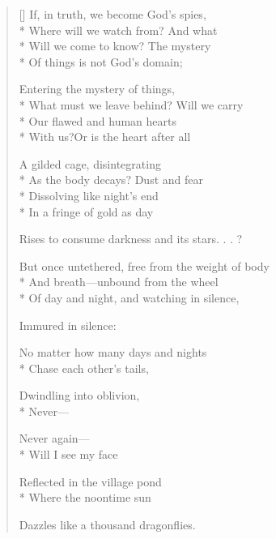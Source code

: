 \label{ch:lear_bl}
\settowidth{\versewidth}{But once untethered, free from the weight of body}
\begin{verse}[\versewidth]
If, in truth, we become God's spies,\\*
Where will we watch from?   And what\\*
Will we come to know?     The mystery\\*
Of things is not God's domain;

Entering the mystery of things,\\*
What must we leave behind?  Will we carry\\*
Our flawed and human hearts\\*
With us?\qquad Or is the heart after all

A gilded cage, disintegrating\\*
As the body decays?   Dust and fear\\*
Dissolving like night's end\\*
In a fringe of gold as day

Rises to consume darkness and its stars. . . ?

But once untethered, free from the weight of body\\*
And breath---unbound from the wheel\\*
Of day and night, and watching in silence,

Immured in silence:

No matter how many days and nights\\*
Chase each other's tails,

Dwindling into oblivion,\\*
Never---

Never again---\\*
Will I see my face

Reflected in the village pond\\*
Where the noontime sun

Dazzles like a thousand dragonflies.
\end{verse}
